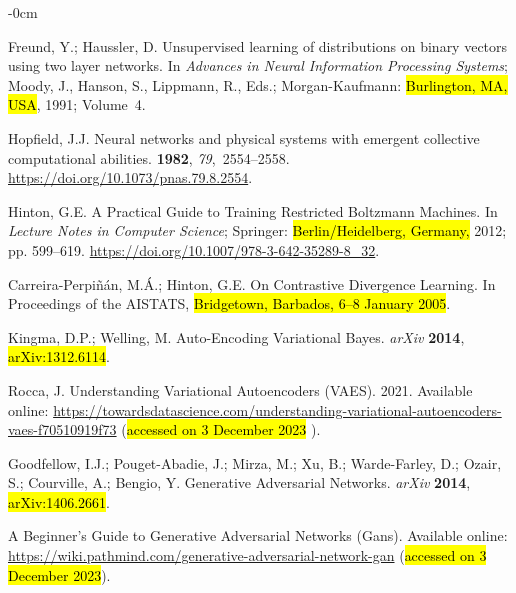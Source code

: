 \documentclass[technologies,article,accept,pdftex,moreauthors]{Definitions/mdpi}
\begin{document}
\begin{adjustwidth}{-\extralength}{0cm}
\begin{thebibliography}{999}
Freund, Y.; Haussler, D.
\newblock Unsupervised learning of distributions on binary vectors using two
  layer networks.
\newblock In \emph{Advances in Neural Information Processing
  Systems}; Moody, J., Hanson, S., Lippmann, R., Eds.; Morgan-Kaufmann: \hl{Burlington, MA, USA}, 1991; Volume~4.

Hopfield, J.J.
\newblock Neural networks and physical systems with emergent collective
  computational abilities.
 {\bf 1982},
  {\em 79},~2554--2558.  {\url{https://doi.org/10.1073/pnas.79.8.2554}}.

Hinton, G.E.
\newblock A Practical Guide to Training Restricted Boltzmann Machines. In {\em   Lecture Notes in Computer Science}; Springer:  \hl{Berlin/Heidelberg, Germany,} %
  2012; pp. 599--619. {\url{https://doi.org/10.1007/978-3-642-35289-8_32}}.

Carreira-Perpi{\~n}{\'a}n, M.{\'A}.; Hinton, G.E. On Contrastive Divergence Learning. In Proceedings of the AISTATS, \hl{Bridgetown, Barbados, 6--8 January 2005}. %


Kingma, D.P.; Welling, M. Auto-Encoding Variational Bayes.  \emph{arXiv} \textbf{2014},  \hl{arXiv:1312.6114}.

Rocca, J. Understanding Variational Autoencoders (VAES). 2021.  Available online: \url{https://towardsdatascience.com/understanding-variational-autoencoders-vaes-f70510919f73} (\hl{accessed on 3 December 2023}%
). 

Goodfellow, I.J.; Pouget-Abadie, J.; Mirza, M.; Xu, B.; Warde-Farley, D.;
  Ozair, S.; Courville, A.; Bengio, Y.
\newblock Generative Adversarial Networks. \emph{arXiv} \textbf{2014},  \hl{ arXiv:1406.2661}.  

A Beginner's Guide to Generative Adversarial Networks (Gans). Available online: \url{https://wiki.pathmind.com/generative-adversarial-network-gan} (\hl{accessed on 3 December 2023}).


\end{thebibliography}
\end{adjustwidth}
\end{document}
